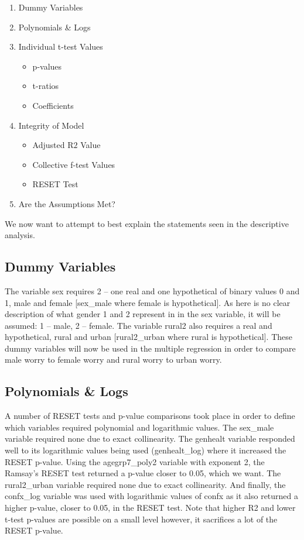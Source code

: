 \documentclass[11pt, english]{article}
\begin{document}
	\begin{enumerate}
	\setlength\itemsep{0cm}
		\item Dummy Variables
		\item Polynomials \& Logs
		\item Individual t-test Values
		\begin{itemize}
			\item p-values
			\item t-ratios
			\item Coefficients
		\end{itemize}
		\item Integrity of Model
		\begin{itemize}
			\item Adjusted R$2$ Value
			\item Collective f-test Values
			\item RESET Test
		\end{itemize}
		\item Are the Assumptions Met?
	\end{enumerate}

	We now want to attempt to best explain the statements seen in the descriptive analysis.\\

	\subsection{Dummy Variables}

	The variable sex requires 2 – one real and one hypothetical of binary values 0 and 1, male and female [sex\_male where female is hypothetical]. As here is no clear description of what gender 1 and 2 represent in in the sex variable, it will be assumed: 1 – male, 2 – female. The variable rural2 also requires a real and hypothetical, rural and urban [rural2\_urban where rural is hypothetical]. These dummy variables will now be used in the multiple regression in order to compare male worry to female worry and rural worry to urban worry.

	\subsection{Polynomials \& Logs}

	A number of RESET tests and p-value comparisons took place in order to define which variables required polynomial and logarithmic values. The sex\_male variable required none due to exact collinearity. The genhealt variable responded well to its logarithmic values being used (genhealt\_log) where it increased the RESET p-value. Using the agegrp7\_poly2 variable with exponent 2, the Ramsay's RESET test returned a p-value closer to 0.05, which we want. The rural2\_urban variable required none due to exact collinearity. And finally, the confx\_log variable was used with logarithmic values of confx as it also returned a higher p-value, closer to 0.05, in the RESET test. Note that higher R2 and lower t-test p-values are possible on a small level however, it sacrifices a lot of the RESET p-value.\\
\end{document}
